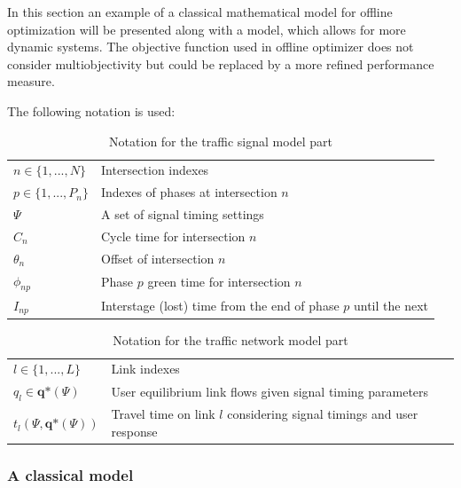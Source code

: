 \label{model}
In this section an example of a classical mathematical model for offline optimization will be presented along with a model, which allows for more dynamic systems. The objective function used in offline optimizer does not consider multiobjectivity but could be replaced by a more refined performance measure.

The following notation is used:

\begin{table}[!ht]
\begin{center}
\begin{tabular}{ll}
\hline
$n \in \lbrace 1,...,N \rbrace$ & Intersection indexes \\
$p \in \lbrace 1,...,P_n \rbrace$ & Indexes of phases at intersection $n$ \\ 
$\Psi$ & A set of signal timing settings \\
$C_n$ & Cycle time for intersection $n$ \\
$\theta_n$ & Offset of intersection $n$ \\
$\phi_{np}$ & Phase $p$ green time for intersection $n$  \\
$I_{np}$ & Interstage (lost) time from the end of phase $p$ until the next  \\
\hline
\end{tabular}
\end{center}
\caption{Notation for the traffic signal model part}
\end{table}

\begin{table}[!ht]
\begin{center}
\begin{tabular}{ll}
\hline
$l \in \lbrace 1,...,L \rbrace$ & Link indexes \\
$q_l \in \textbf{q*}(\Psi)$ & User equilibrium link flows given signal timing parameters  \\
$t_l(\Psi,\textbf{q*}(\Psi))$ & Travel time on link $l$ considering signal timings and user response \\
\hline
\end{tabular}
\end{center}
\caption{Notation for the traffic network model part}
\end{table}

\subsubsection*{A classical model}

